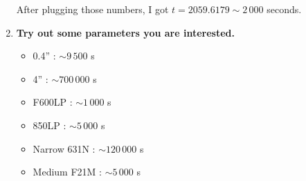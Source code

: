 \documentclass[12pt,letterpaper]{article}
\begin{document}
\begin{enumerate}
    After plugging those numbers, I got $t = 2059.6179 \sim 2\,000$ seconds. 
    
    \item {\bf Try out some parameters you are interested.}
    
    \begin{itemize}
        \item  0.4'' : $\sim 9\,500$ s
        \item 4''    : $\sim 700\,000$ s
        \item F600LP : $\sim 1\,000$ s
        \item 850LP  : $\sim 5\,000$ s
        \item Narrow 631N : $\sim 120\,000$ s
        \item Medium F21M : $\sim 5\,000$ s
    \end{itemize}

\end{enumerate}
\end{document}
